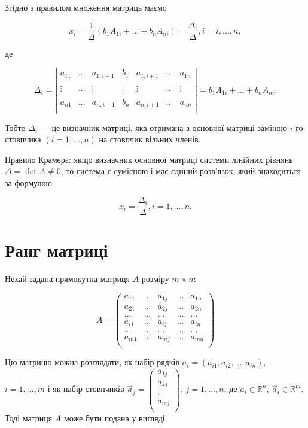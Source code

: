 Згідно з правилом множення матриць маємо

$$x_i = \dfrac{1}{\Delta}(b_1 A_{1i} + ... + b_n A_{ni}) = \dfrac{\Delta_i}{\Delta}, i = i, ..., n,$$

де

$$\Delta_i = \left| \begin{matrix}
	a_{11} & ... & a_{1, i-1} & b_1    & a_{1,i+1} & ... & a_{1 n} \\
	& & & & & & \\
	\vdots & ... & \vdots     & \vdots & \vdots & ... & \vdots     \\
	& & & & & & \\	
	a_{n1} & ... & a_{n, i-1} & b_n    & a_{n,i+1} & ... & a_{n n} \\
\end{matrix} \right| = b_1 A_{1i} + ... + b_n A_{ni}.$$

Тобто $\Delta_i$ --- це визначник матриці, яка отримана з основної матриці заміною $i$-го
стовпчика $(i = 1, ..., n)$ на стовпчик вільних членів.

Правило Крамера: якщо визначник основної матриці системи лінійних рівнянь
$\Delta = \det A \neq 0$, то система є сумісною і має єдиний розв’язок, який знаходиться за
формулою

$$x_i = \dfrac{\Delta_i}{\Delta}, i = 1, ..., n.$$

\section{Ранг матриці}  %

Нехай задана прямокутна матриця $A$ розміру $m \times n$:

$$ A = \begin{pmatrix}
	a_{11} & ... & a_{1j} & ... & a_{1n} \\
	a_{21} & ... & a_{2j} & ... & a_{2n} \\
	...    & ... & ...    & ... & ...    \\
	a_{i1} & ... & a_{ij} & ... & a_{in} \\
	...    & ... & ...    & ... & ...    \\
	a_{m1} & ... & a_{mj} & ... & a_{mn} \\
\end{pmatrix} $$


Цю матрицю можна розглядати, як набір рядків $\overleftarrow{a}_i = (a_{i1}, a_{i2}, ..., a_{in})$, $i = 1, ..., m$ і
як набір стовпчиків $\overrightarrow{a}_j = \begin{pmatrix}
	a_{1j} \\
	a_{2j} \\
	\vdots \\
	a_{mj} \\
\end{pmatrix} $, $j = 1, ..., n$, де $\overleftarrow{a}_i \in \mathbb{R}^n$, 
$\overrightarrow{a}_i \in \mathbb{R}^m$. Тоді матриця $A$
може бути подана у вигляді:

